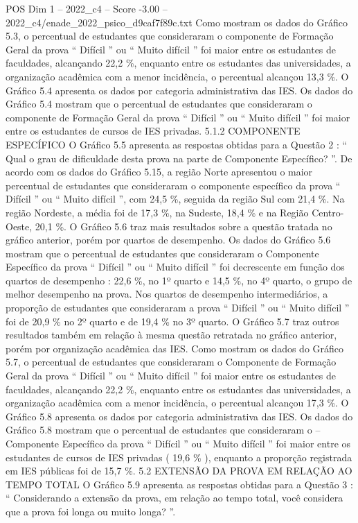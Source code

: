 \begin{textsample}{POS Dim 1 – 2022\_c4 – Score -3.00 – 2022\_c4/enade\_2022\_psico\_d9caf7f89c.txt}
Como mostram os dados do Gráfico 5.3, o percentual de estudantes que consideraram o componente de Formação Geral da prova “ Difícil ” ou “ Muito difícil ” foi maior entre os estudantes de faculdades, alcançando 22,2 \%, enquanto entre os estudantes das universidades, a organização acadêmica com a menor incidência, o percentual alcançou 13,3 \%.
O Gráfico 5.4 apresenta os dados por categoria administrativa das IES.
Os dados do Gráfico 5.4 mostram que o percentual de estudantes que consideraram o componente de Formação Geral da prova “ Difícil ” ou “ Muito difícil ” foi maior entre os estudantes de cursos de IES privadas. 5.1.2 COMPONENTE ESPECÍFICO O Gráfico 5.5 apresenta as respostas obtidas para a Questão 2 : “ Qual o grau de dificuldade desta prova na parte de Componente Específico? ”.
De acordo com os dados do Gráfico 5.15, a região Norte apresentou o maior percentual de estudantes que consideraram o componente específico da prova “ Difícil ” ou “ Muito difícil ”, com 24,5 \%, seguida da região Sul com 21,4 \%.
Na região Nordeste, a média foi de 17,3 \%, na Sudeste, 18,4 \% e na Região Centro-Oeste, 20,1 \%.
O Gráfico 5.6 traz mais resultados sobre a questão tratada no gráfico anterior, porém por quartos de desempenho.
Os dados do Gráfico 5.6 mostram que o percentual de estudantes que consideraram o Componente Específico da prova “ Difícil ” ou “ Muito difícil ” foi decrescente em função dos quartos de desempenho : 22,6 \%, no 1º quarto e 14,5 \%, no 4º quarto, o grupo de melhor desempenho na prova.
Nos quartos de desempenho intermediários, a proporção de estudantes que consideraram a prova “ Difícil ” ou “ Muito difícil ” foi de 20,9 \% no 2º quarto e de 19,4 \% no 3º quarto.
O Gráfico 5.7 traz outros resultados também em relação à mesma questão retratada no gráfico anterior, porém por organização acadêmica das IES.
Como mostram os dados do Gráfico 5.7, o percentual de estudantes que consideraram o Componente de Formação Geral da prova “ Difícil ” ou “ Muito difícil ” foi maior entre os estudantes de faculdades, alcançando 22,2 \%, enquanto entre os estudantes das universidades, a organização acadêmica com a menor incidência, o percentual alcançou 17,3 \%.
O Gráfico 5.8 apresenta os dados por categoria administrativa das IES.
Os dados do Gráfico 5.8 mostram que o percentual de estudantes que consideraram o – Componente Específico da prova “ Difícil ” ou “ Muito difícil ” foi maior entre os estudantes de cursos de IES privadas ( 19,6 \% ), enquanto a proporção registrada em IES públicas foi de 15,7 \%. 5.2 EXTENSÃO DA PROVA EM RELAÇÃO AO TEMPO TOTAL O Gráfico 5.9 apresenta as respostas obtidas para a Questão 3 : “ Considerando a extensão da prova, em relação ao tempo total, você considera que a prova foi longa ou muito longa? ”.

\end{textsample}
